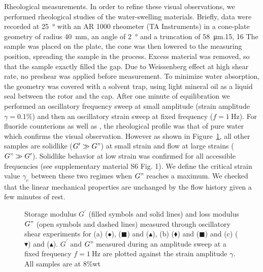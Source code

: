 \documentclass[journal=jacsat,manuscript=article]{achemso}
\begin{document}
Rheological measurements. In order to refine these visual observations, we performed rheological studies of the water-swelling materials. Briefly, data were recorded at \SI{25}{\degree} with an AR 1000 rheometer (TA Instruments) in a cone-plate geometry of radius \SI{40}{\milli\metre}, an angle of \SI{2}{\degree} and a truncation of \SI{58}{\micro\metre}.15, 16 The sample was placed on the plate, the cone was then lowered to the measuring position, spreading the sample in the process. Excess material was removed, so that the sample exactly filled the gap. Due to Weissenberg effect at high shear rate, no preshear was applied before measurement. To minimize water absorption, the geometry was covered with a solvent trap, using light mineral oil as a liquid seal between the rotor and the cap. After one minute of equilibration we performed an oscillatory frequency sweep at small amplitude (strain amplitude $\gamma=0.1\%$) and then an oscillatory strain sweep at fixed frequency ($f=\SI{1}{\hertz}$). For fluoride counterions as well as , the rheological profile was that of pure water which confirms the visual observation. However as shown in Figure~\ref{fig:strain}, all other samples are solidlike ($G^\prime \gg G"$) at small strain and flow at large strains ($G" \gg G^\prime$). Solidlike behavior at low strain was confirmed for all accessible frequencies (see supplementary material S6 Fig. 1). We define the critical strain value $\gamma_c$ between these two regimes when $G"$ reaches a maximum. We checked that the linear mechanical properties are unchanged by the flow history given a few minutes of rest. %

\begin{figure}
\caption{Storage modulus $G^\prime$ (filled symbols and solid lines) and loss modulus $G"$ (open symbols and dashed lines) measured through oscillatory shear experiments for (a)  ($\bullet$),  ($\blacksquare$) and  ($\blacktriangle$), (b)  ($\blacklozenge$) and  ($\blacksquare$) and (c)  ($\blacktriangledown$) and  ($\blacktriangle$). $G^\prime$  and $G"$ measured during an amplitude sweep at a fixed frequency $f=\SI{1}{\hertz}$ are plotted against the strain amplitude $\gamma$. All samples are at 8\%wt }
\label{fig:strain}
\end{figure}
\end{document}
